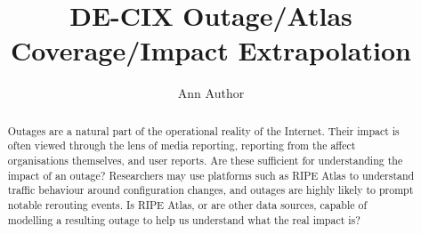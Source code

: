 \documentclass[sigconf]{acmart}
\begin{document}
\title{DE-CIX Outage/Atlas Coverage/Impact Extrapolation}


\author{Ann Author}

\renewcommand{\shortauthors}{Ann Author, et al}

\begin{abstract}

Outages are a natural part of the operational reality of the Internet. Their
impact is often viewed through the lens of media reporting, reporting from the
affect organisations themselves, and user reports. Are these sufficient for
understanding the impact of an outage? Researchers may use platforms such as
RIPE Atlas to understand traffic behaviour around configuration changes, and
outages are highly likely to prompt notable rerouting events. Is RIPE Atlas, or
are other data sources, capable of modelling a resulting outage to help us
understand what the real impact is?
\end{abstract}

\maketitle





\end{document}
